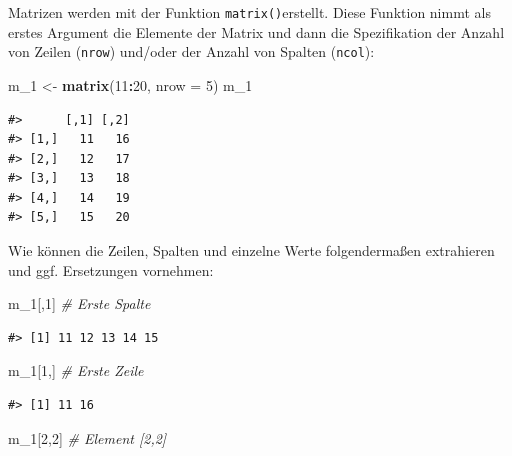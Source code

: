 \documentclass[]{book}
\newenvironment{Shaded}{\begin{snugshade}}{\end{snugshade}}
\newcommand{\KeywordTok}[1]{\textcolor[rgb]{0.13,0.29,0.53}{\textbf{#1}}}
\newcommand{\DataTypeTok}[1]{\textcolor[rgb]{0.13,0.29,0.53}{#1}}
\newcommand{\DecValTok}[1]{\textcolor[rgb]{0.00,0.00,0.81}{#1}}
\newcommand{\StringTok}[1]{\textcolor[rgb]{0.31,0.60,0.02}{#1}}
\newcommand{\CommentTok}[1]{\textcolor[rgb]{0.56,0.35,0.01}{\textit{#1}}}
\newcommand{\OperatorTok}[1]{\textcolor[rgb]{0.81,0.36,0.00}{\textbf{#1}}}
\newcommand{\NormalTok}[1]{#1}
\begin{document}
Matrizen werden mit der Funktion \texttt{matrix()}erstellt. Diese
Funktion nimmt als erstes Argument die Elemente der Matrix und dann die
Spezifikation der Anzahl von Zeilen (\texttt{nrow}) und/oder der Anzahl
von Spalten (\texttt{ncol}):

\begin{Shaded}
\begin{Highlighting}[]
\NormalTok{m_}\DecValTok{1}\NormalTok{ <-}\StringTok{ }\KeywordTok{matrix}\NormalTok{(}\DecValTok{11}\OperatorTok{:}\DecValTok{20}\NormalTok{, }\DataTypeTok{nrow =} \DecValTok{5}\NormalTok{)}
\NormalTok{m_}\DecValTok{1}
\end{Highlighting}
\end{Shaded}

\begin{verbatim}
#>      [,1] [,2]
#> [1,]   11   16
#> [2,]   12   17
#> [3,]   13   18
#> [4,]   14   19
#> [5,]   15   20
\end{verbatim}

Wie können die Zeilen, Spalten und einzelne Werte folgendermaßen
extrahieren und ggf. Ersetzungen vornehmen:

\begin{Shaded}
\begin{Highlighting}[]
\NormalTok{m_}\DecValTok{1}\NormalTok{[,}\DecValTok{1}\NormalTok{] }\CommentTok{# Erste Spalte}
\end{Highlighting}
\end{Shaded}

\begin{verbatim}
#> [1] 11 12 13 14 15
\end{verbatim}

\begin{Shaded}
\begin{Highlighting}[]
\NormalTok{m_}\DecValTok{1}\NormalTok{[}\DecValTok{1}\NormalTok{,] }\CommentTok{# Erste Zeile}
\end{Highlighting}
\end{Shaded}

\begin{verbatim}
#> [1] 11 16
\end{verbatim}

\begin{Shaded}
\begin{Highlighting}[]
\NormalTok{m_}\DecValTok{1}\NormalTok{[}\DecValTok{2}\NormalTok{,}\DecValTok{2}\NormalTok{] }\CommentTok{# Element [2,2]}
\end{Highlighting}
\end{Shaded}
\end{document}
